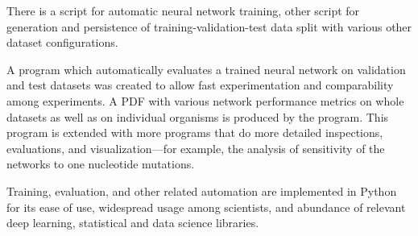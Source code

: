 There is a script for automatic neural network training, other script for
generation and persistence of training-validation-test data split with various
other dataset configurations.

A program which automatically evaluates a trained neural network on validation
and test datasets was created to allow fast experimentation and comparability
among experiments. A PDF with various network performance metrics on whole
datasets as well as on individual organisms is produced by the program. This
program is extended with more programs that do more detailed inspections,
evaluations, and visualization---for example, the analysis of sensitivity of
the networks to one nucleotide mutations.

Training, evaluation, and other related automation are implemented in Python
for its ease of use, widespread usage among scientists, and abundance of
relevant deep learning, statistical and data science libraries.
